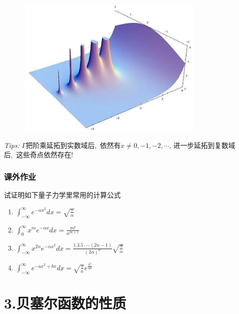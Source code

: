 \begin{frame}
	\frametitle{}
  \begin{center}
	   \includegraphics[width=0.85\textwidth,height=2.7in]{figs/2022-03-26-17-20-10.png}
  \end{center}
  \alert{\textit{Tips:\hspace{1em}}} $\Gamma$把阶乘延拓到实数域后, 依然有$x \not = 0,-1,-2,\cdots$, 
进一步延拓到复数域后, 这些奇点依然存在!
\end{frame}

\begin{frame}
	\frametitle{课外作业}
	试证明如下量子力学里常用的计算公式
	\begin{enumerate}
		\item $ \int_{-\infty}^{\infty} e^{-\alpha x^{2}} d x=\sqrt{\frac{\pi}{\alpha}}$
		\item $\int_{0}^{\infty} x^{m} e^{-\alpha x} d x=\frac{m !}{\alpha^{m+1}}$ 
		\item $ \int_{-\infty}^{\infty} x^{2 n} e^{-\alpha x^{2}} d x=\frac{1.3 .5 \cdot \cdots(2 n-1)}{(2 \alpha)^{n}} \sqrt{\frac{\pi}{\alpha}}$
		\item $ \int_{-\infty}^{\infty} e^{-a x^{2}+b x} d x=\sqrt{\frac{\pi}{a}} e^{\frac{b^{2}}{4 a}}$
	\end{enumerate}
\end{frame}

\section{3.贝塞尔函数的性质}

